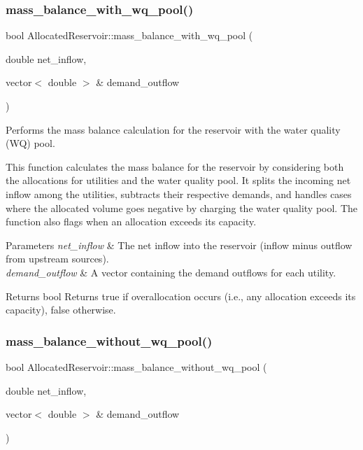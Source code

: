 \subsubsection{\texorpdfstring{mass\+\_\+balance\+\_\+with\+\_\+wq\+\_\+pool()}{mass\_balance\_with\_wq\_pool()}}
{\footnotesize\ttfamily bool Allocated\+Reservoir\+::mass\+\_\+balance\+\_\+with\+\_\+wq\+\_\+pool (\begin{DoxyParamCaption}\item[{double}]{net\+\_\+inflow,  }\item[{vector$<$ double $>$ \&}]{demand\+\_\+outflow }\end{DoxyParamCaption})}



Performs the mass balance calculation for the reservoir with the water quality (WQ) pool. 

This function calculates the mass balance for the reservoir by considering both the allocations for utilities and the water quality pool. It splits the incoming net inflow among the utilities, subtracts their respective demands, and handles cases where the allocated volume goes negative by charging the water quality pool. The function also flags when an allocation exceeds its capacity.


\begin{DoxyParams}{Parameters}
{\em net\+\_\+inflow} & The net inflow into the reservoir (inflow minus outflow from upstream sources). \\
\hline
{\em demand\+\_\+outflow} & A vector containing the demand outflows for each utility.\\
\hline
\end{DoxyParams}
\begin{DoxyReturn}{Returns}
bool Returns {\ttfamily true} if overallocation occurs (i.\+e., any allocation exceeds its capacity), {\ttfamily false} otherwise. 
\end{DoxyReturn}
\mbox{\label{classAllocatedReservoir_ac719b30d5a83ba19ea722449ce9580e1}} 
\subsubsection{\texorpdfstring{mass\+\_\+balance\+\_\+without\+\_\+wq\+\_\+pool()}{mass\_balance\_without\_wq\_pool()}}
{\footnotesize\ttfamily bool Allocated\+Reservoir\+::mass\+\_\+balance\+\_\+without\+\_\+wq\+\_\+pool (\begin{DoxyParamCaption}\item[{double}]{net\+\_\+inflow,  }\item[{vector$<$ double $>$ \&}]{demand\+\_\+outflow }\end{DoxyParamCaption})}



